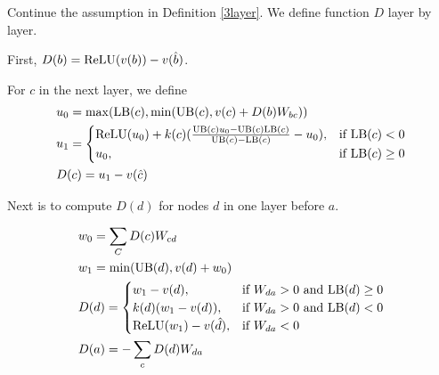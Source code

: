\begin{definition}
	Continue the assumption in Definition \ref{3layer}. We define function $D$ layer by layer.
	
	First, $D(b) = \mathrm{ReLU}(v(b))-v(\hat{b})$.
	
For $c$ in the next layer, we define \begin{align*}
	&u_0 = \max(\mathrm{LB}(c),\min(\mathrm{UB}(c),  v(c)+D(b)W_{bc}))\\
	&u_1 = \begin{cases}
		\mathrm{ReLU}(u_0)+k(c)(\frac{\mathrm{UB}(c)u_0-\mathrm{UB}(c)\mathrm{LB}(c)}{\mathrm{UB}(c)-\mathrm{LB}(c)}-u_0), & \text{if }\mathrm{LB}(c) < 0\\
	u_0, & \text{if }  \mathrm{LB}(c) \geq 0
	\end{cases}\\
	&D(c) = u_1-v(\hat{c})
\end{align*}
	
	Next is to compute $D(d)$ for nodes $d$ in one layer before $a$.
	
	\begin{align*}
		&w_0 = \sum_C D(c)W_{cd}\\
		&w_1 = \min(\mathrm{UB}(d),v(d)+w_0)\\		
		&D(d) =
		\begin{cases}
			w_1-v({d}), & \text{if }W_{da} > 0 \text{ and } \mathrm{LB}(d)\geq 0\\
		k(d)(w_1-v({d})), & \text{if }W_{da} > 0 \text{ and } \mathrm{LB}(d)< 0\\
		\mathrm{ReLU}(w_1)-v(\hat{d})	, & \text{if }  W_{da} < 0
		\end{cases}\\
		&D(a) = -\sum_c D(d)W_{da}
	\end{align*}
\end{definition}
		
